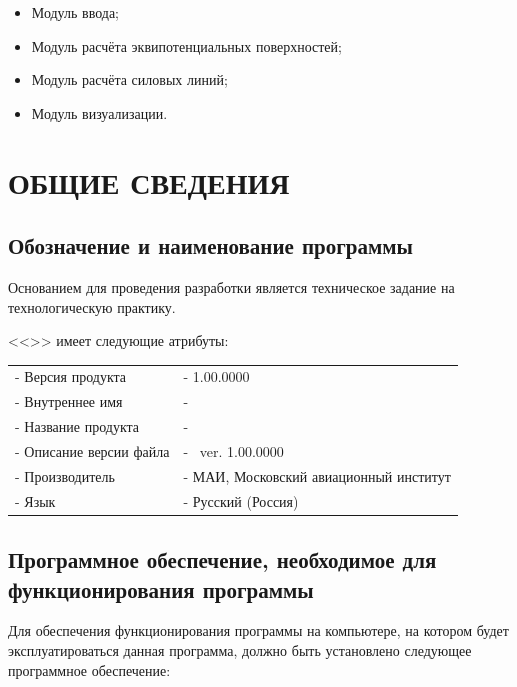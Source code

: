 \documentclass[14pt,a4paper,final]{extreport}
\begin{document}
\begin{itemize}
	\item Модуль ввода;
	\item Модуль расчёта эквипотенциальных поверхностей;
	\item Модуль расчёта силовых линий;
	\item Модуль визуализации.
\end{itemize}

\pagebreak


\begin{small}
\tableofcontents
\end{small}

\pagebreak

\chapter{ОБЩИЕ СВЕДЕНИЯ}
\section{Обозначение и наименование программы}

Основанием для проведения разработки является техническое задание на технологическую практику.

<<\doctitleoneline>> имеет следующие атрибуты:
\begin{table}[ht]
	\centering
	\begin{tabular}{p{7cm} p{11cm}}
		- Версия продукта &  - 1.00.0000\\ 
		- Внутреннее имя	 &  - \programtitle \\
		- Название продукта &  - \programtitle \\
		- Описание версии файла &  - \programtitle\ ver. 1.00.0000 \\
		- Производитель &  - МАИ, Московский авиационный институт \\ %
		- Язык &  - Русский (Россия) \\																	
	\end{tabular}
\end{table}

\section{Программное обеспечение, необходимое для функционирования программы}

Для обеспечения функционирования программы на компьютере, на котором будет эксплуатироваться данная программа, должно быть установлено следующее программное обеспечение:
\end{document}
